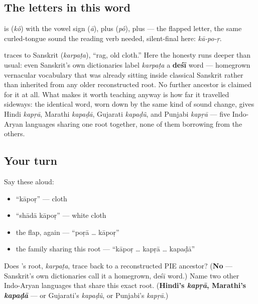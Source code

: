 \subsection*{The letters in this word}
\textbf{} is \textbf{} (\emph{kô}) with the vowel sign \textbf{} (\emph{ā}), plus \textbf{} (\emph{pô}), plus \textbf{} — the flapped letter, the same curled-tongue sound the reading verb needed, silent-final here: \emph{kā-po-ṛ}.

\begin{cousinweb}
\textbf{} traces to Sanskrit \textbf{} (\emph{karpaṭa}), \textquotedblleft{}rag, old cloth.\textquotedblright{} Here the honesty runs deeper than usual: even Sanskrit's own dictionaries label \emph{karpaṭa} a \textbf{deśī} word — homegrown vernacular vocabulary that was already sitting inside classical Sanskrit rather than inherited from any older reconstructed root. No further ancestor is claimed for it at all. What makes it worth teaching anyway is how far it travelled sideways: the identical word, worn down by the same kind of sound change, gives Hindi \emph{kapṛā}, Marathi \emph{kapaḍā}, Gujarati \emph{kapaḍũ}, and Punjabi \emph{kapṛā} — five Indo-Aryan languages sharing one root together, none of them borrowing from the others.
\end{cousinweb}

\subsection*{Your turn}
Say these aloud:

\begin{itemize}
\raggedright
  \item \textquotedblleft{}kāpoṛ\textquotedblright{} — cloth
  \item \textquotedblleft{}shādā kāpoṛ\textquotedblright{} — white cloth
  \item the flap, again — \textquotedblleft{}poṛā … kāpoṛ\textquotedblright{}
  \item the family sharing this root — \textquotedblleft{}kāpoṛ … kapṛā … kapaḍā\textquotedblright{}
\end{itemize}

\begin{tcolorbox}[breakable,colback=teal!4,colframe=teal!35!black,title={Before you move on}]
Does 's root, \emph{karpaṭa}, trace back to a reconstructed PIE ancestor? (\textbf{No} — Sanskrit's own dictionaries call it a homegrown, deśī word.) Name two other Indo-Aryan languages that share this exact root. (\textbf{Hindi's \emph{kapṛā}, Marathi's \emph{kapaḍā}} — or Gujarati's \emph{kapaḍũ}, or Punjabi's \emph{kapṛā}.)
\end{tcolorbox}

